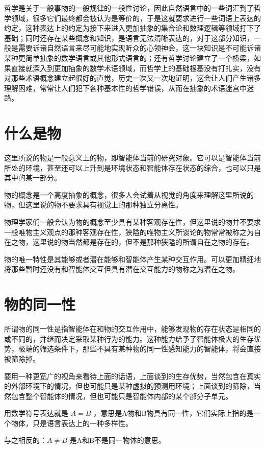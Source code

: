 \documentclass[12pt,oneside]{book}
\begin{document}
哲学是关于一般事物的一般规律的一般性讨论，因此自然语言中的一些词汇到了哲学领域，很多它们最终都会被认为是等价的，于是这就要求进行一些词语上表达的约定，这种表达上的约定为接下来进入更加抽象的集合论和数理逻辑等领域打下了基础；同时还存在某些概念和知识，是语言无法清晰表达的，对于这部分知识，一般是需要诉诸自然语言来尽可能地实现听众的心领神会，这一块知识是不可能诉诸某种更简单抽象的数学语言或其他形式语言的；还有哲学讨论建立了一个桥梁，如果直接就深入到更加抽象的数学术语领域，而哲学上的基础根基没有打扎实，没有对那些术语概念建立起很好的直觉，历史一次又一次地证明，这会让人们产生诸多理解困难，常常让人们犯下各种基本性的哲学错误，从而在抽象的术语迷宫中迷路。



\section{什么是物}
这里所说的物是一般意义上的物，即智能体当前的研究对象。它可以是智能体当前所处的环境，甚至还可以上升到是环境状态和智能体存在状态的综合，也可以只是其中的某一部分。

物的概念是一个高度抽象的概念，很多人会试着从视觉的角度来理解这里所说的物，但这里说的物不要求具有视觉上的那种独立分离性。

物理学家们一般会认为物的概念至少具有某种客观存在性，但这里说的物并不要求一般唯物主义观点的那种客观存在性，狭隘的唯物主义所谈论的物常常被称之为自在之物，这里说的物当然都是存在的，但不是那种狭隘的所谓自在之物的存在。

物的唯一特性是其能够或者潜在能够和智能体产生某种交互作用。可以更加精细地将那些暂时还没有和智能体交互但具有潜在交互能力的物称之为潜在之物。

\section{物的同一性}
所谓物的同一性是指智能体在和物的交互作用中，能够发现物的存在状态是相同的或不同的，并继而决定采取某种行为的能力。这种能力给予了智能体极大的生存优势，极端的筛选条件下，那些不具有某种物的同一性感知能力的智能体，将会直接被筛除掉。

要用一种更宽广的视角来看待上面的话语，上面谈到的生存优势，当然包含在真实的外部环境下的情况，但也可能只是某种虚拟的预测用环境；上面谈到的筛除，当然包含整个智能体的情况，但也可能只是智能体内部的某个部分子单元。

用数学符号表达就是 $A=B$ ，意思是A物和B物具有同一性，它们实际上指的是一个物体，只是语言表达上的一种多样性。

与之相反的：$A \neq B$ 是A和B不是同一物体的意思。
\end{document}
